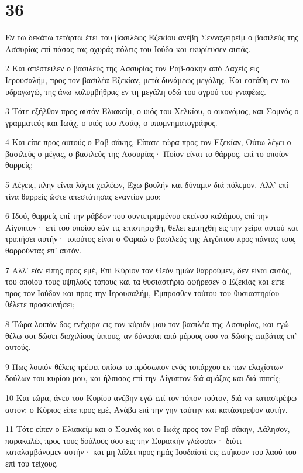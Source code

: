 \chapter{36}

\par Εν τω δεκάτω τετάρτω έτει του βασιλέως Εζεκίου ανέβη Σενναχειρείμ ο βασιλεύς της Ασσυρίας επί πάσας τας οχυράς πόλεις του Ιούδα και εκυρίευσεν αυτάς.
\par 2 Και απέστειλεν ο βασιλεύς της Ασσυρίας τον Ραβ-σάκην από Λαχείς εις Ιερουσαλήμ, προς τον βασιλέα Εζεκίαν, μετά δυνάμεως μεγάλης. Και εστάθη εν τω υδραγωγώ, της άνω κολυμβήθρας εν τη μεγάλη οδώ του αγρού του γναφέως.
\par 3 Τότε εξήλθον προς αυτόν Ελιακείμ, ο υιός του Χελκίου, ο οικονόμος, και Σομνάς ο γραμματεύς και Ιωάχ, ο υιός του Ασάφ, ο υπομνηματογράφος.
\par 4 Και είπε προς αυτούς ο Ραβ-σάκης, Είπατε τώρα προς τον Εζεκίαν, Ούτω λέγει ο βασιλεύς ο μέγας, ο βασιλεύς της Ασσυρίας· Ποίον είναι το θάρρος, επί το οποίον θαρρείς;
\par 5 Λέγεις, πλην είναι λόγοι χειλέων, Έχω βουλήν και δύναμιν διά πόλεμον. Αλλ' επί τίνα θαρρείς ώστε απεστάτησας εναντίον μου;
\par 6 Ιδού, θαρρείς επί την ράβδον του συντετριμμένου εκείνου καλάμου, επί την Αίγυπτον· επί του οποίου εάν τις επιστηριχθή, θέλει εμπηχθή εις την χείρα αυτού και τρυπήσει αυτήν· τοιούτος είναι ο Φαραώ ο βασιλεύς της Αιγύπτου προς πάντας τους θαρρούντας επ' αυτόν.
\par 7 Αλλ' εάν είπης προς εμέ, Επί Κύριον τον Θεόν ημών θαρρούμεν, δεν είναι αυτός, του οποίου τους υψηλούς τόπους και τα θυσιαστήρια αφήρεσεν ο Εζεκίας και είπε προς τον Ιούδαν και προς την Ιερουσαλήμ, Έμπροσθεν τούτου του θυσιαστηρίου θέλετε προσκυνήσει;
\par 8 Τώρα λοιπόν δος ενέχυρα εις τον κύριόν μου τον βασιλέα της Ασσυρίας, και εγώ θέλω σοι δώσει δισχιλίους ίππους, αν δύνασαι από μέρους σου να δώσης επιβάτας επ' αυτούς.
\par 9 Πως λοιπόν θέλεις τρέψει οπίσω το πρόσωπον ενός τοπάρχου εκ των ελαχίστων δούλων του κυρίου μου, και ήλπισας επί την Αίγυπτον διά αμάξας και διά ιππείς;
\par 10 Και τώρα, άνευ του Κυρίου ανέβην εγώ επί τον τόπον τούτον, διά να καταστρέψω αυτόν; ο Κύριος είπε προς εμέ, Ανάβα επί την γην ταύτην και κατάστρεψον αυτήν.
\par 11 Τότε είπεν ο Ελιακείμ και ο Σομνάς και ο Ιωάχ προς τον Ραβ-σάκην, Λάλησον, παρακαλώ, προς τους δούλους σου εις την Συριακήν γλώσσαν· διότι καταλαμβάνομεν αυτήν· και μη λάλει προς ημάς Ιουδαϊστί εις επήκοον του λαού του επί του τείχους.
